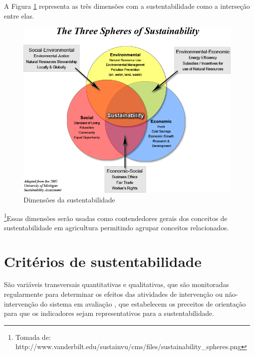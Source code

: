 A Figura \ref{fig:sustainability_spheres} representa as três dimensões
com a sustentabilidade como a interseção entre elas.

\begin{figure}[h]
\begin{centering}
\includegraphics[width=1\columnwidth]{figures/sustainability_spheres}
\par\end{centering}
\caption{Dimensões da sustentabilidade \label{fig:sustainability_spheres}}
\end{figure}

\footnote{Tomada de: http://www.vanderbilt.edu/sustainvu/cms/files/sustainability\_spheres.png}Essas
dimensões serão usadas como contendedores gerais dos conceitos de
sustentabilidade em agricultura permitindo agrupar conceitos relacionados.

\section{Critérios de sustentabilidade}

São variáveis transversais quantitativas e qualitativas, que são monitoradas
regularmente para determinar os efeitos das atividades de intervenção
ou não-intervenção do sistema em avaliação \citet{deusdara2001criterios},
que estabelecem os preceitos de orientação para que os indicadores
sejam representativos para a sustentabilidade.

